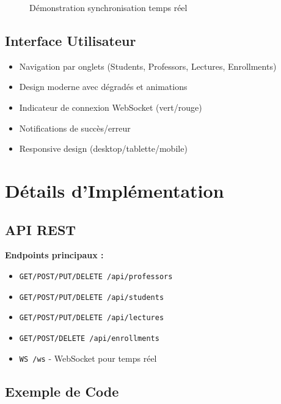 \documentclass{article}
\begin{document}
\begin{figure}[H]
    \centering
    \caption{Démonstration synchronisation temps réel}
\end{figure}

\subsection{Interface Utilisateur}

\begin{itemize}
    \item Navigation par onglets (Students, Professors, Lectures, Enrollments)
    \item Design moderne avec dégradés et animations
    \item Indicateur de connexion WebSocket (vert/rouge)
    \item Notifications de succès/erreur
    \item Responsive design (desktop/tablette/mobile)
\end{itemize}

\clearpage
\section{Détails d'Implémentation}

\subsection{API REST}

\textbf{Endpoints principaux :}
\begin{itemize}
    \item \texttt{GET/POST/PUT/DELETE /api/professors}
    \item \texttt{GET/POST/PUT/DELETE /api/students}
    \item \texttt{GET/POST/PUT/DELETE /api/lectures}
    \item \texttt{GET/POST/DELETE /api/enrollments}
    \item \texttt{WS /ws} - WebSocket pour temps réel
\end{itemize}

\subsection{Exemple de Code}
\end{document}
